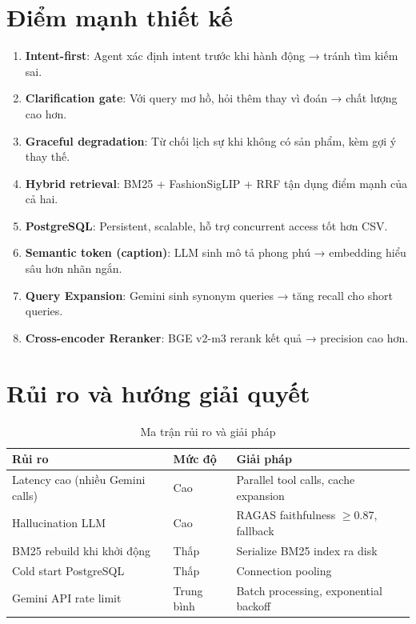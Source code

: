 \documentclass[12pt,a4paper]{report}
\begin{document}
\section{Điểm mạnh thiết kế}
\begin{enumerate}
    \item \textbf{Intent-first}: Agent xác định intent trước khi hành động → tránh tìm kiếm sai.
    \item \textbf{Clarification gate}: Với query mơ hồ, hỏi thêm thay vì đoán → chất lượng cao hơn.
    \item \textbf{Graceful degradation}: Từ chối lịch sự khi không có sản phẩm, kèm gợi ý thay thế.
    \item \textbf{Hybrid retrieval}: BM25 + FashionSigLIP + RRF tận dụng điểm mạnh của cả hai.
    \item \textbf{PostgreSQL}: Persistent, scalable, hỗ trợ concurrent access tốt hơn CSV.
    \item \textbf{Semantic token (caption)}: LLM sinh mô tả phong phú → embedding hiểu sâu hơn nhãn ngắn.
    \item \textbf{Query Expansion}: Gemini sinh synonym queries → tăng recall cho short queries.
    \item \textbf{Cross-encoder Reranker}: BGE v2-m3 rerank kết quả → precision cao hơn.
\end{enumerate}

\section{Rủi ro và hướng giải quyết}

\begin{table}[H]
\centering
\begin{tabular}{lll}
\toprule
\textbf{Rủi ro} & \textbf{Mức độ} & \textbf{Giải pháp}\\
\midrule
Latency cao (nhiều Gemini calls) & Cao & Parallel tool calls, cache expansion\\
Hallucination LLM & Cao & RAGAS faithfulness $\geq$0.87, fallback\\
BM25 rebuild khi khởi động & Thấp & Serialize BM25 index ra disk\\
Cold start PostgreSQL & Thấp & Connection pooling\\
Gemini API rate limit & Trung bình & Batch processing, exponential backoff\\
\bottomrule
\end{tabular}
\caption{Ma trận rủi ro và giải pháp}
\end{table}
\end{document}

